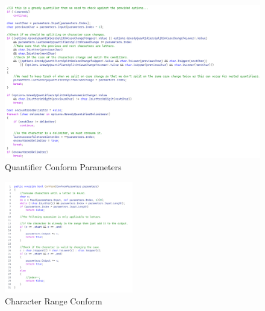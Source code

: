 \begin{figure}
    \centering
    \caption{Quantifier Conform Parameters}
    \label{fig:QuantifierConformParameters}
    \includegraphics[width=1.0\textwidth]{Figures/QuantifierConformParameters.png}
\end{figure}

\begin{figure}
    \centering
    \caption{Character Range Conform}
    \label{fig:CharacterRangeConform}
    \includegraphics[width=0.5\textwidth]{Figures/CharacterRangeConform.png}
\end{figure}
